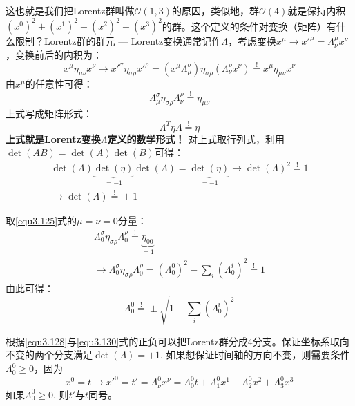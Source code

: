这也就是我们把Lorentz群叫做$\mathcal{O}(1, 3)$的原因，类似地，群$\mathcal{O}(4)$就是保持内积$ (x^0)^2 + (x^1)^2 + (x^2)^2 + (x^3)^2$的群。这个定义的条件对变换（矩阵）有什么限制？Lorentz群的群元 --- Lorentz变换通常记作$\Lambda$，考虑变换$x^\mu \rightarrow x'^\mu = \Lambda^\mu_\nu x^\nu$，变换前后的内积为：
\begin{equation}
\label{equ3.124}
x^\mu \eta_{\mu \nu} x^\nu \rightarrow x'^\sigma \eta_{\sigma \rho} x'^\rho = (x^\mu \Lambda^\sigma_\mu) \eta_{\sigma \rho} (\Lambda^\rho_\nu x^\nu) \stackrel{!}{=} x^\mu \eta_{\mu \nu} x^\nu
\end{equation}
由$x^{\mu}$的任意性可得：
\begin{equation}
\label{equ3.125}
\Lambda^\sigma_\mu \eta_{\sigma \rho} \Lambda^\rho_\nu \stackrel{!}{=} \eta_{\mu \nu}
\end{equation}
上式写成矩阵形式：
\begin{equation}
\label{equ3.126}
\Lambda^T \eta \Lambda \stackrel{!}{=} \eta
\end{equation}
{\bf 上式就是Lorentz变换$\Lambda$定义的数学形式！} 对上式取行列式，利用$\det(AB) = \det(A) \det(B)$可得：
\begin{align}
\label{equ3.127}
\det(\Lambda) \underbrace{\det(\eta)}_{= -1} \det(\Lambda) = \underbrace{\det(\eta)}_{= -1} \rightarrow \det(\Lambda)^2 \stackrel{!}{=} 1 \\
\label{equ3.128}
\rightarrow \det(\Lambda) \stackrel{!}{=} \pm 1
\end{align}

取\eqref{equ3.125}式的$\mu = \nu = 0$分量：
\begin{align}
	\Lambda_0^\sigma \eta_{\sigma \rho} \Lambda_0^\rho \stackrel{!}{=} \underbrace{\eta_{00}}_{=1} \nonumber \\
	\label{equ3.129}
	\rightarrow \Lambda_0^\sigma \eta_{\sigma \rho} \Lambda_0^\rho = (\Lambda_0^0)^2 - \sum_i (\Lambda_0^i)^2 \stackrel{!}{=} 1
\end{align}
由此可得：
\begin{equation}
	\label{equ3.130}
	\Lambda_0^0 \stackrel{!}{=} \pm \sqrt{1 + \sum_i (\Lambda_0^i)^2}
\end{equation}

根据\eqref{equ3.128}与\eqref{equ3.130}式的正负可以把Lorentz群分成4分支。保证坐标系取向不变的两个分支满足$\det (\Lambda) = +1$. 如果想保证时间轴的方向不变，则需要条件$\Lambda_0^0 \geq 0$，因为
\begin{equation}
	\label{equ3.131}
	x^0 = t \rightarrow x'^0 = t' = \Lambda_\nu^0 x^\nu = \Lambda_0^0 t + \Lambda_1^0 x^1 + \Lambda_2^0 x^2 + \Lambda_3^0 x^3
\end{equation}
如果$\Lambda_0^0 \geq 0$, 则$t'$与$t$同号。

